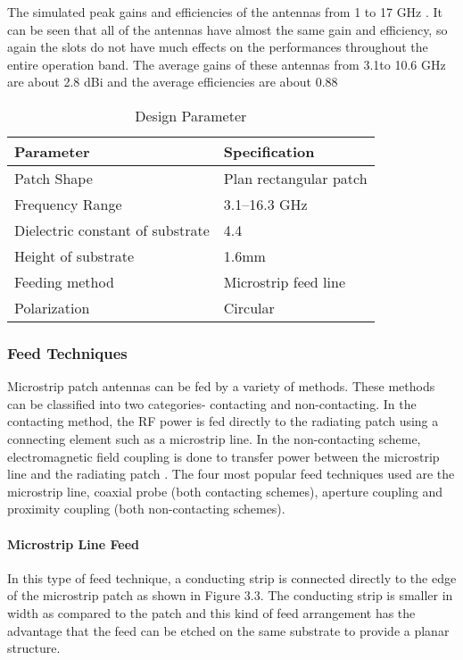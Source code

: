         The simulated peak gains and efficiencies of the antennas from 1 to 17 GHz . It can be seen that all of the antennas have almost the same gain and efficiency, so again the slots do not have much effects on the performances throughout the entire operation band. The average gains of these antennas from 3.1to 10.6 GHz are about 2.8 dBi and the average efficiencies are about 0.88

         \begin{center}
         		\begin{table}[H]
         			\centering
         			\begin{tabular}{ |l|l|}
         				\hline
         				Parameter & Specification \\ \hline
         				Patch Shape &  Plan rectangular patch \\ \hline
         				Frequency Range &  3.1–16.3 GHz \\ \hline
         				Dielectric constant of substrate & 4.4 \\ \hline
         				Height of substrate &   1.6mm \\ \hline
         				Feeding method &  Microstrip feed line \\ \hline
         				Polarization &  Circular \\ \hline
         			\end{tabular}
         			\caption{Design Parameter}
         		\end{table}
         \end{center}

        \subsubsection{Feed Techniques}
          \justify
           Microstrip patch antennas can be fed by a variety of methods. These methods can be
           classified into two categories- contacting and non-contacting. In the contacting method, the RF power is fed directly to the radiating patch using a connecting element such as a microstrip line. In the non-contacting scheme, electromagnetic field coupling is done to transfer power between the microstrip line and the radiating patch . The four most popular feed techniques used are the microstrip line, coaxial probe (both contacting schemes), aperture coupling and proximity coupling (both non-contacting schemes).

         \paragraph{ Microstrip Line Feed}
           \justify
            In this type of feed technique, a conducting strip is connected directly to the edge of the microstrip patch as shown in Figure 3.3. The conducting strip is smaller in width as compared to the patch and this kind of feed arrangement has the advantage that the feed can be etched on the same substrate to provide a planar structure.

